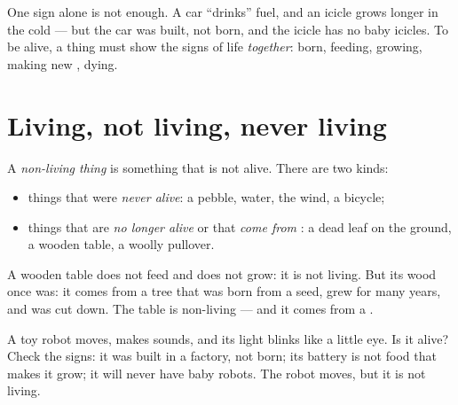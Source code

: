 \begin{remark}\label{rem:g1:living-or-not:allsigns}
One sign alone is not enough. A car ``drinks'' fuel, and an icicle
grows longer in the cold --- but the car was built, not born, and the
icicle has no baby icicles. To be alive, a thing must show the signs
of life \emph{together}: born, feeding, growing, making new , dying.
\end{remark}

\section{Living, not living, never living}

\begin{definition}\label{def:g1:living-or-not:nonliving}
A \emph{non-living thing} is something that
is not alive. There are two kinds:
\begin{itemize}
  \item things that were \emph{never alive}: a
        pebble, water, the wind, a bicycle;
  \item things that are \emph{no longer alive} or that \emph{come from} : a dead leaf on
        the ground, a wooden table, a woolly pullover.
\end{itemize}
\end{definition}

\begin{example}\label{ex:g1:living-or-not:table}
A wooden table does not feed and does not grow: it is not living.
But its wood once was: it comes from a tree that was born from a
seed, grew for many years, and was cut down. The table is non-living
--- and it comes from a .
\end{example}

\begin{example}\label{ex:g1:living-or-not:robot}
A toy robot moves, makes sounds, and its light blinks like a little
eye. Is it alive? Check the signs: it was built in a factory, not
born; its battery is not food that makes it grow; it will never have
baby robots. The robot moves, but it is not living.
\end{example}

